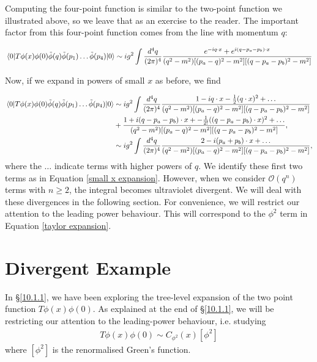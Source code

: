 \documentclass{article}
\begin{document}
Computing the four-point function is similar to the two-point function we illustrated above, so we leave that as an exercise to the reader. The important factor from this four-point function comes from the line with momentum $q$:

\begin{equation}
    \mel{0}{T\phi(x)\phi(0)\Tilde{\phi}(q)\Tilde{\phi}(p_1)\dots\Tilde{\phi}(p_4)}{0} \sim ig^2\int \frac{d^4q}{(2\pi)^4}\frac{e^{-iq\cdot x}+e^{i(q-p_a-p_b)\cdot x}}{(q^2-m^2)[(p_a-q)^2-m^2][(q-p_a-p_b)^2-m^2]}
\end{equation}

Now, if we expand in powers of small $x$ as before, we find 

\begin{equation}
    \begin{split}
        \mel{0}{T\phi(x)\phi(0)\Tilde{\phi}(q)\Tilde{\phi}(p_1)\dots\Tilde{\phi}(p_4)}{0} &\sim ig^2\int \frac{d^4q}{(2\pi)^4}\frac{1-iq\cdot x -\frac{1}{2}(q\cdot x)^2+\dots}{(q^2-m^2)[(p_a-q)^2-m^2][(q-p_a-p_b)^2-m^2]}\\
        &+ \frac{1+i(q-p_a-p_b)\cdot x+ -\frac{1}{2!}((q-p_a-p_b)\cdot x)^2+\dots}{(q^2-m^2)[(p_a-q)^2-m^2][(q-p_a-p_b)^2-m^2]},\\
        &\sim ig^2\int \frac{d^4q}{(2\pi)^4}\frac{2 - i(p_a+p_b)\cdot x +\dots}{(q^2-m^2)[(p_a-q)^2-m^2][(q-p_a-p_b)^2-m^2]},
    \end{split}
\end{equation}
where the $\dots$ indicate terms with higher powers of $q$. We identify these first two terms as in Equation \ref{small x expansion}. However, when we consider $\mathcal{O}(q^n)$ terms with $n\geq 2$, the integral becomes ultraviolet divergent.  We will deal with these divergences in the following section. For convenience, we will restrict our attention to the leading power behaviour. This will correspond to the $\phi^2$ term in Equation \ref{taylor expansion}. 

\section{Divergent Example}\label{10.1.2}
In \S\ref{10.1.1}, we have been exploring the tree-level expansion of the two point function $T\phi(x)\phi(0)$. As explained at the end of \S\ref{10.1.1}, we will be restricting our attention to the leading-power behaviour, i.e. studying
\begin{align}
\label{c_phi2}
    T\phi(x)\phi(0) \sim C_{\phi^2}(x)[\phi^2]
\end{align}
where $[\phi^2]$ is the renormalised Green's function. \\
\end{document}
